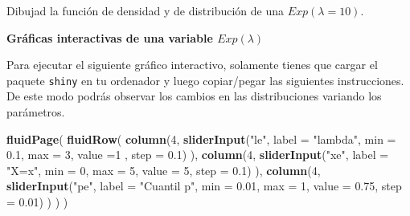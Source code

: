 \documentclass[]{book}
\newenvironment{Shaded}{\begin{snugshade}}{\end{snugshade}}
\newcommand{\DataTypeTok}[1]{\textcolor[rgb]{0.13,0.29,0.53}{#1}}
\newcommand{\DecValTok}[1]{\textcolor[rgb]{0.00,0.00,0.81}{#1}}
\newcommand{\FloatTok}[1]{\textcolor[rgb]{0.00,0.00,0.81}{#1}}
\newcommand{\KeywordTok}[1]{\textcolor[rgb]{0.13,0.29,0.53}{\textbf{#1}}}
\newcommand{\NormalTok}[1]{#1}
\newcommand{\StringTok}[1]{\textcolor[rgb]{0.31,0.60,0.02}{#1}}
\begin{document}
Dibujad la función de densidad y de distribución de una \(Exp(\lambda=10).\)

\textbf{Gráficas interactivas de una variable \(Exp(\lambda)\)}

Para ejecutar el siguiente gráfico interactivo, solamente tienes que cargar el paquete \texttt{shiny} en tu ordenador y luego copiar/pegar las siguientes instrucciones. De este modo podrás observar los cambios en las distribuciones variando los parámetros.

\begin{Shaded}
\begin{Highlighting}[]
\KeywordTok{fluidPage}\NormalTok{(}
\KeywordTok{fluidRow}\NormalTok{(}
  \KeywordTok{column}\NormalTok{(}\DecValTok{4}\NormalTok{,}
         \KeywordTok{sliderInput}\NormalTok{(}\StringTok{"le"}\NormalTok{, }\DataTypeTok{label =} \StringTok{"lambda"}\NormalTok{,}
              \DataTypeTok{min =} \FloatTok{0.1}\NormalTok{, }\DataTypeTok{max =} \DecValTok{3}\NormalTok{, }\DataTypeTok{value =}\DecValTok{1}\NormalTok{ , }\DataTypeTok{step =} \FloatTok{0.1}\NormalTok{)}
\NormalTok{         ),}
  \KeywordTok{column}\NormalTok{(}\DecValTok{4}\NormalTok{,}
          \KeywordTok{sliderInput}\NormalTok{(}\StringTok{"xe"}\NormalTok{, }\DataTypeTok{label =} \StringTok{"X=x"}\NormalTok{,}
                     \DataTypeTok{min =} \DecValTok{0}\NormalTok{, }\DataTypeTok{max =} \DecValTok{5}\NormalTok{, }\DataTypeTok{value =} \DecValTok{5}\NormalTok{, }\DataTypeTok{step =} \FloatTok{0.1}\NormalTok{)}
\NormalTok{         ),}
  \KeywordTok{column}\NormalTok{(}\DecValTok{4}\NormalTok{,}
          \KeywordTok{sliderInput}\NormalTok{(}\StringTok{"pe"}\NormalTok{, }\DataTypeTok{label =} \StringTok{"Cuantil p"}\NormalTok{,}
                     \DataTypeTok{min =} \FloatTok{0.01}\NormalTok{, }\DataTypeTok{max =} \DecValTok{1}\NormalTok{, }\DataTypeTok{value =} \FloatTok{0.75}\NormalTok{, }\DataTypeTok{step =} \FloatTok{0.01}\NormalTok{)}
\NormalTok{         )}
\NormalTok{)}
\NormalTok{)}


\end{Highlighting}
\end{Shaded}
\end{document}
